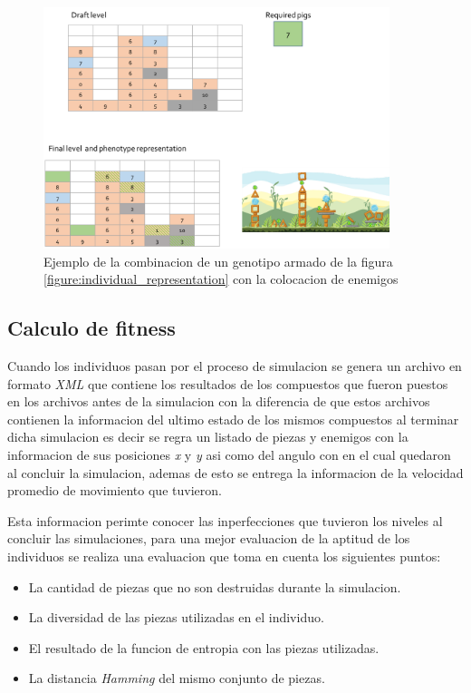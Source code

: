 \begin{figure}
  \centering
  \includegraphics[width=0.9\textwidth]{img/layer123_combine.png}
  \caption{Ejemplo de la combinacion de un genotipo armado de la figura \ref{figure:individual_representation} con la colocacion de enemigos}
  \label{figure:ind_representation_plus_pigs}
\end{figure}

\subsection{Calculo de fitness}
\label{subsection:fitness_calculation}

Cuando los individuos pasan por el proceso de simulacion se genera un archivo en
formato \textit{XML} que contiene los resultados de los compuestos que fueron
puestos en los archivos antes de la simulacion con la diferencia de que estos
archivos contienen la informacion del ultimo estado de los mismos compuestos al
terminar dicha simulacion es decir se regra un listado de piezas y enemigos con
la informacion de sus posiciones \textit{x} y \textit{y} asi como del angulo con
en el cual quedaron al concluir la simulacion, ademas de esto se entrega la
informacion de la velocidad promedio de movimiento que tuvieron.

Esta informacion perimte conocer las inperfecciones que tuvieron los niveles al
concluir las simulaciones, para una mejor evaluacion de la aptitud de los
individuos se realiza una evaluacion que toma en cuenta los siguientes puntos:
\begin{itemize}
  \item La cantidad de piezas que no son destruidas durante la simulacion.
  \item La diversidad de las piezas utilizadas en el individuo.
  \item El resultado de la funcion de entropia con las piezas utilizadas.
  \item La distancia \textit{Hamming} del mismo conjunto de piezas.
\end{itemize}

